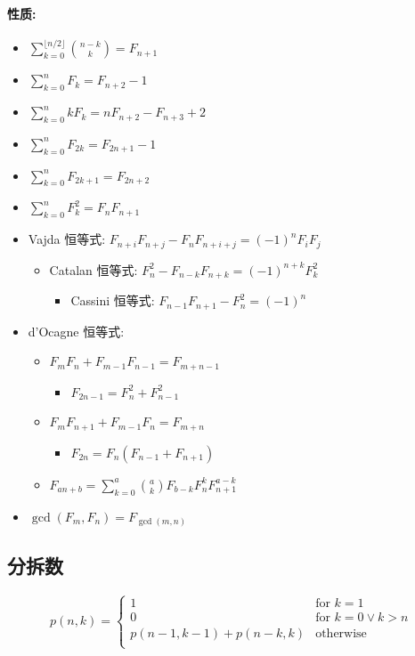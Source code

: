 \paragraph{性质:}
\begin{itemize}
  \item $\displaystyle\sum_{k=0}^{\lfloor n/2\rfloor}\binom{n-k}k=F_{n+1}$
  \item $\displaystyle\sum_{k=0}^nF_k=F_{n+2}-1$
  \item $\displaystyle\sum_{k=0}^nkF_k=nF_{n+2}-F_{n+3}+2$
  \item $\displaystyle\sum_{k=0}^nF_{2k}=F_{2n+1}-1$
  \item $\displaystyle\sum_{k=0}^nF_{2k+1}=F_{2n+2}$
  \item $\displaystyle\sum_{k=0}^nF_k^2=F_nF_{n+1}$
  \item Vajda 恒等式: $F_{n+i}F_{n+j}-F_nF_{n+i+j}=(-1)^nF_iF_j$
  \begin{itemize}
    \item Catalan 恒等式: $F_n^2-F_{n-k}F_{n+k}=(-1)^{n+k}F_k^2$
    \begin{itemize}
      \item Cassini 恒等式: $F_{n-1}F_{n+1}-F_n^2=(-1)^n$
    \end{itemize}
  \end{itemize}
  \item d'Ocagne 恒等式:
  \begin{itemize}
    \item $F_mF_n+F_{m-1}F_{n-1}=F_{m+n-1}$
    \begin{itemize}
      \item $F_{2n-1}=F_n^2+F_{n-1}^2$
    \end{itemize}
    \item $F_mF_{n+1}+F_{m-1}F_n=F_{m+n}$
    \begin{itemize}
      \item $F_{2n}=F_n(F_{n-1}+F_{n+1})$
    \end{itemize}
  \item $\displaystyle F_{an+b}=\sum_{k=0}^a\binom akF_{b-k}F_n^kF_{n+1}^{a-k}$
  \end{itemize}
  \item $\gcd(F_m,F_n)=F_{\gcd(m,n)}$
\end{itemize}

\clearpage
\subsection{分拆数}
\[
p(n,k)=\begin{cases}
  1&\text{for }k=1\\
  0&\text{for }k=0\lor k>n\\
  p(n-1,k-1)+p(n-k,k)&\text{otherwise}\\
\end{cases}
\]

